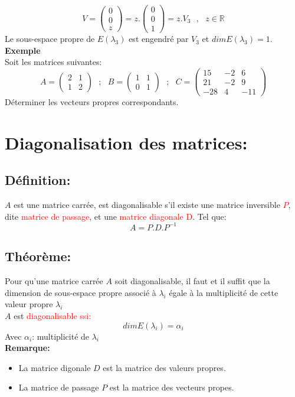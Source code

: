 \documentclass[a4paper,12pt,french]{article}
\begin{document}
	\[V=\begin{pmatrix}
		0  \\
		0  \\
		z
		
	\end{pmatrix}=z.\begin{pmatrix}
		0  \\
		0  \\
		1
		
	\end{pmatrix}=z.V_{3}~~~,~~~ z \in \mathbb{R}\]
	Le sous-espace propre de $E(\lambda_{3})$ est engendré par $V_{3} $ et $dim E(\lambda_{3})=1$.\\
	\textbf{Exemple}\\
	Soit les matrices suivantes:
	\[A=\begin{pmatrix}
		2 & 1  \\
		1 & 2 
		
	\end{pmatrix}~~~; ~~~B=\begin{pmatrix}
		1 & 1  \\
		0 & 1 
		
	\end{pmatrix}~~~; ~~~C=\begin{pmatrix}
		15 & -2 & 6  \\
		21 & -2 & 9\\
		-28 & 4 & -11
		
	\end{pmatrix}
	\]
	Déterminer les vecteurs propres correspondants.
	\section{Diagonalisation des matrices:}
	\subsection{Définition:}
	$A$ est une matrice carrée, est diagonalisable s'il existe une matrice inversible \textcolor{red} {$P$}, dite \textcolor{red}{matrice de passage}, et une \textcolor{red}{ matrice diagonale} \textcolor{red}{D}. Tel que: \[A=P.D.P^{-1}\]
	\subsection{Théorème:}
	Pour qu'une matrice carrée $A$ soit diagonalisable, il faut et il suffit que la dimension de sous-espace propre associé à $\lambda_{i}$ égale à la multiplicité de cette valeur propre $\lambda_{i}$\\
	$A$ est \textcolor{red}{diagonalisable ssi:}
	\[dim E(\lambda_{i})=\alpha_{i}\] Avec $\alpha_{i}$: multiplicité de $ \lambda_{i}$\\
	\textbf{Remarque:}\\
	\begin{itemize}
		\item La matrice digonale $D$ est la matrice des valeurs propres.
		\item La matrice de passage $P$ est la matrice des vecteurs propes.
	\end{itemize}
\end{document}
